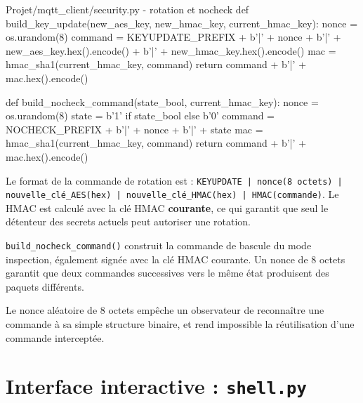 \documentclass[a4paper,11pt]{report}
\begin{document}
\begin{pycode}{Projet/mqtt\_client/security.py - rotation et nocheck}
def build_key_update(new_aes_key, new_hmac_key, current_hmac_key):
    nonce = os.urandom(8)
    command = KEYUPDATE_PREFIX + b'|' + nonce + b'|' + new_aes_key.hex().encode() + b'|' + new_hmac_key.hex().encode()
    mac = hmac_sha1(current_hmac_key, command)
    return command + b'|' + mac.hex().encode()

def build_nocheck_command(state_bool, current_hmac_key):
    nonce = os.urandom(8)
    state = b'1' if state_bool else b'0'
    command = NOCHECK_PREFIX + b'|' + nonce + b'|' + state
    mac = hmac_sha1(current_hmac_key, command)
    return command + b'|' + mac.hex().encode()
\end{pycode}

Le format de la commande de rotation est :
\texttt{KEYUPDATE | nonce(8 octets) | nouvelle\_clé\_AES(hex) | nouvelle\_clé\_HMAC(hex) | HMAC(commande)}.
Le HMAC est calculé avec la clé HMAC \textbf{courante}, ce qui garantit que seul le détenteur des secrets
actuels peut autoriser une rotation.

\texttt{build\_nocheck\_command()} construit la commande de bascule du mode inspection, également signée
avec la clé HMAC courante. Un nonce de 8 octets garantit que deux commandes successives vers le même état
produisent des paquets différents.

\begin{explication}
Le nonce aléatoire de 8 octets empêche un observateur de reconnaître une commande à sa simple structure
binaire, et rend impossible la réutilisation d'une commande interceptée.
\end{explication}

\section{Interface interactive : \texttt{shell.py}}
\end{document}

